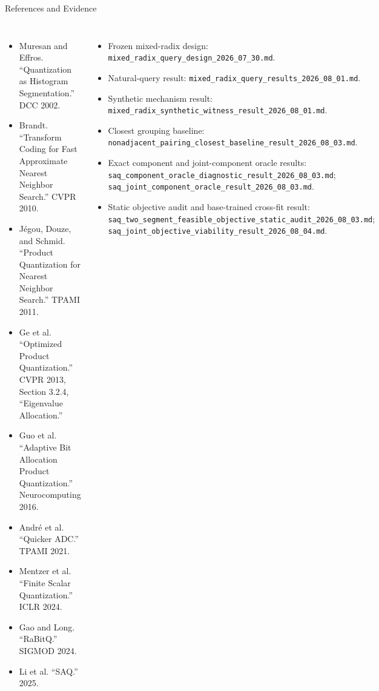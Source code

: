 \documentclass[aspectratio=169]{beamer}
\begin{document}
\begin{frame}{References and Evidence}
\tiny
\begin{columns}[T]
\begin{itemize}
  \item Muresan and Effros. ``Quantization as Histogram Segmentation.''
  DCC 2002.
  \item Brandt. ``Transform Coding for Fast Approximate Nearest Neighbor
  Search.'' CVPR 2010.
  \item J\'egou, Douze, and Schmid. ``Product Quantization for Nearest
  Neighbor Search.'' TPAMI 2011.
  \item Ge et al. ``Optimized Product Quantization.'' CVPR 2013,
  Section 3.2.4, ``Eigenvalue Allocation.''
  \item Guo et al. ``Adaptive Bit Allocation Product Quantization.''
  Neurocomputing 2016.
  \item Andr\'e et al. ``Quicker ADC.'' TPAMI 2021.
  \item Mentzer et al. ``Finite Scalar Quantization.'' ICLR 2024.
  \item Gao and Long. ``RaBitQ.'' SIGMOD 2024.
  \item Li et al. ``SAQ.'' 2025.
\end{itemize}
\begin{itemize}
  \item Frozen mixed-radix design:
  \texttt{mixed\_radix\_query\_design\_2026\_07\_30.md}.
  \item Natural-query result:
  \texttt{mixed\_radix\_query\_results\_2026\_08\_01.md}.
  \item Synthetic mechanism result:
  \texttt{mixed\_radix\_synthetic\_witness\_result\_2026\_08\_01.md}.
  \item Closest grouping baseline:
  \texttt{nonadjacent\_pairing\_closest\_baseline\_result\_2026\_08\_03.md}.
  \item Exact component and joint-component oracle results:
  \texttt{saq\_component\_oracle\_diagnostic\_result\_2026\_08\_03.md};
  \texttt{saq\_joint\_component\_oracle\_result\_2026\_08\_03.md}.
  \item Static objective audit and base-trained cross-fit result:
  \texttt{saq\_two\_segment\_feasible\_objective\_static\_audit\_2026\_08\_03.md};
  \texttt{saq\_joint\_objective\_viability\_result\_2026\_08\_04.md}.
\end{itemize}
\end{columns}
\end{frame}
\end{document}
